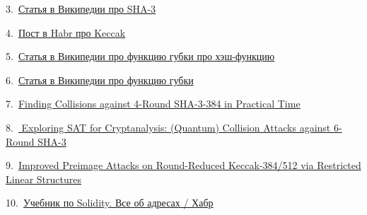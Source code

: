 \documentclass[a4paper,12pt]{article}
\theoremstyle{plain} %
\theoremstyle{definition} %
\theoremstyle{remark} %
\begin{document}
	3.\ \href{https://ru.wikipedia.org/wiki/SHA-3}{Статья в Википедии про SHA-3}
	
	4.\ \href{https://habr.com/ru/post/534082/}{Пост в Habr про Keccak}
	
	5.\ \href{https://ru.wikipedia.org/wiki/Хеш-функция}{Статья в Википедии про функцию губки про хэш-функцию}
	
	6.\ \href{https://ru.wikipedia.org/wiki/Функция_губки}{Статья в Википедии про функцию губки}
	
	7.\ \href{https://docs.yandex.ru/docs/view?tm=1670581012&tld=ru&lang=en&name=194.pdf&text=Finding%20Collisions%20against%204-Round%20SHA-3-384%20in%20Practical%20Time&url=https%3A%2F%2Feprint.iacr.org%2F2022%2F194.pdf&lr=213&mime=pdf&l10n=ru&sign=df3555ad7abdca412bd3d1f72d819fd6&keyno=0&serpParams=tm%3D1670581012%26tld%3Dru%26lang%3Den%26name%3D194.pdf%26text%3DFinding%2BCollisions%2Bagainst%2B4-Round%2BSHA-3-384%2Bin%2BPractical%2BTime%26url%3Dhttps%253A%2F%2Feprint.iacr.org%2F2022%2F194.pdf%26lr%3D213%26mime%3Dpdf%26l10n%3Dru%26sign%3Ddf3555ad7abdca412bd3d1f72d819fd6%26keyno%3D0}{Finding Collisions against 4-Round SHA-3-384 in Practical Time}
	
	8.\ \href{https://docs.yandex.ru/docs/view?tm=1670581674&tld=ru&lang=en&name=184.pdf&text=Exploring%20SAT%20for%20Cryptanalysis%3A%20(Quantum)%20Collision%20Attacks%20against%206-Round%20SHA-3&url=https%3A%2F%2Feprint.iacr.org%2F2022%2F184.pdf&lr=214&mime=pdf&l10n=ru&sign=0b0eb5e3f96ac5853b282eebfebc9e20&keyno=0&serpParams=tm%3D1670581674%26tld%3Dru%26lang%3Den%26name%3D184.pdf%26text%3DExploring%2BSAT%2Bfor%2BCryptanalysis%253A%2B%2528Quantum%2529%2BCollision%2BAttacks%2Bagainst%2B6-Round%2BSHA-3%26url%3Dhttps%253A%2F%2Feprint.iacr.org%2F2022%2F184.pdf%26lr%3D214%26mime%3Dpdf%26l10n%3Dru%26sign%3D0b0eb5e3f96ac5853b282eebfebc9e20%26keyno%3D0}{ Exploring SAT for Cryptanalysis: (Quantum) Collision Attacks against 6-Round SHA-3}
	
	9.\
	\href{https://docs.yandex.ru/docs/view?tm=1670582387&tld=ru&lang=en&name=788.pdf&text=Improved%20Preimage%20Attacks%20on%20Round-Reduced%20Keccak-384%2F512%20via%20Restricted%20Linear%20Structures&url=https%3A%2F%2Feprint.iacr.org%2F2022%2F788.pdf&lr=213&mime=pdf&l10n=ru&sign=d880f70fe33c1fb1f84165be0ce9440c&keyno=0&serpParams=tm%3D1670582387%26tld%3Dru%26lang%3Den%26name%3D788.pdf%26text%3DImproved%2BPreimage%2BAttacks%2Bon%2BRound-Reduced%2BKeccak-384%2F512%2Bvia%2BRestricted%2BLinear%2BStructures%26url%3Dhttps%253A%2F%2Feprint.iacr.org%2F2022%2F788.pdf%26lr%3D213%26mime%3Dpdf%26l10n%3Dru%26sign%3Dd880f70fe33c1fb1f84165be0ce9440c%26keyno%3D0}{Improved Preimage Attacks on Round-Reduced
		Keccak-384/512 via Restricted Linear Structures}
	
 10.\ 
 \href{https://habr.com/ru/post/572456/}{Учебник по Solidity. Все об адресах / Хабр}

	

	

	
	
	
	
	
\end{document}

